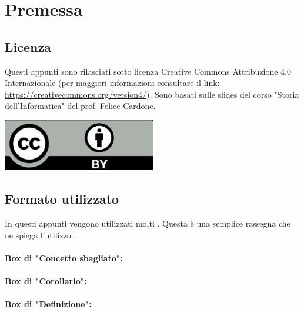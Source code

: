 \chapter{Premessa}

\section{Licenza}

Questi appunti sono rilasciati sotto licenza Creative Commons Attribuzione 4.0 Internazionale (per maggiori
informazioni consultare il link: \href{https://creativecommons.org/version4/}{https://creativecommons.org/version4/}). Sono basati sulle slides del corso "Storia dell'Informatica" del prof. Felice Cardone.
\begin{center}
    \includegraphics[width=0.5\textwidth]{images/cc.png}
\end{center}

\section{Formato utilizzato}

In questi appunti vengono utilizzati molti . Questa è una semplice 
rassegna che ne spiega l'utilizzo:

\subsubsection{Box di "Concetto sbagliato":}


\subsubsection{Box di "Corollario":}


\subsubsection{Box di "Definizione":}

